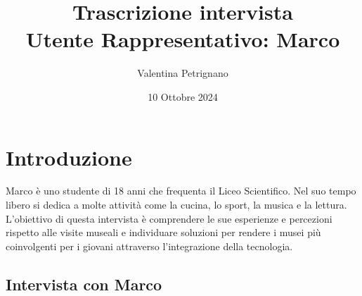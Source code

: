 \documentclass{article}
\title{\textbf{Trascrizione intervista}\\ Utente Rappresentativo: Marco}
\author{Valentina Petrignano }
\date{10 Ottobre 2024}
\begin{document}
\maketitle

\section{Introduzione}
Marco è uno studente di 18 anni che frequenta il Liceo Scientifico. Nel suo tempo libero si dedica a molte attività come la cucina, lo sport, la musica e la lettura. L’obiettivo di questa intervista è comprendere le sue esperienze e percezioni rispetto alle visite museali e individuare soluzioni per rendere i musei più coinvolgenti per i giovani attraverso l’integrazione della tecnologia.

\subsection{\textcolor{subsectioncolor}{Intervista con Marco}}
\end{document}
